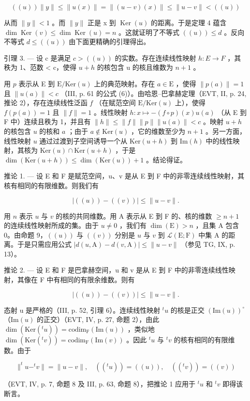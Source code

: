 \[
((u)) \| y \| \leqslant \| u (x) \| = \| (u - v) (x) \| \leqslant \| u - v \| <   ((u))
\]

从而 \(\|y\| < 1\) 。而 \(\|y\|\) 正是 x 到 \(\operatorname{Ker}(u)\) 的距离。于是定理 4 蕴含 \(\dim \operatorname{Ker}(v) \leqslant \dim \operatorname{Ker}(u) = n\) 。这就证明了不等式 \(((u)) \leqslant d\) 。反向不等式 \(d \leqslant ((u))\) 由下面更精确的引理得出。

引理 3. — 设 c 是满足 \(c > ((u))\) 的实数。存在连续线性映射 \(h: E \to F\) ，其秩为 1、范数 \textless{} c，使得 \(u + h\) 的核包含 u 的核且维数为 \(n + 1\) 。

用 \(p\) 表示从 E 到 \(\mathrm{E} / \mathrm{Ker}(u)\) 上的典范映射。存在 \(a \in \mathrm{E}\) ，使得 \(\| p(a) \| = 1\) 且 \(\| u(a) \| < c\) （III, p. 61 的公式 (6)）。由哈恩–巴拿赫定理（EVT, II, p. 24, 推论 2），存在连续线性泛函 \(f\) （在赋范空间 \(\mathrm{E} / \mathrm{Ker}(u)\) 上），使得 \(f(p(a)) = 1\) 且 \(\| f \| = 1\) 。线性映射 \(h: x \mapsto -(f \circ p)(x)u(a)\) （从 E 到 F 中）连续且秩为 1，并且有 \(\| h \| \leqslant \| f \| \| p \| \| u(a) \| < c\) 。映射 \(u + h\) 的核包含 \(u\) 的核和 \(a\) ；由于 \(a \notin \mathrm{Ker}(u)\) ，它的维数至少为 \(n + 1\) 。另一方面，线性映射 \(u\) 通过过渡到子空间诱导一个从 \(\mathrm{Ker}(u + h)\) 到 \(\mathrm{Im}(h)\) 中的线性映射，其核为 \(\mathrm{Ker}(u) \cap \mathrm{Ker}(u + h)\) ，于是 \(\dim(\mathrm{Ker}(u + h)) \leqslant \dim(\mathrm{Ker}(u)) + 1\) 。结论得证。

推论 1. --- 设 E 和 F 是赋范空间，u、v 是从 E 到 F 中的非零连续线性映射，其核有相同的有限维数。则我们有

\[
\left| \left((u)\right) - ((v)) \right| \leqslant \| u - v \|.
\]

用 \(n\) 表示 \(u\) 与 \(v\) 的核的共同维数。用 A 表示从 E 到 F 的、核的维数 \(\geqslant n + 1\) 的连续线性映射所成的集。由于 \(u \neq 0\) ，我们有 \(\dim(\mathrm{E}) > n\) ，且集 A 包含 0。由命题 9，\(((u))\) 与 \(((v))\) 分别是 \(u\) 与 \(v\) 到 \(\mathcal{L}(\mathrm{E};\mathrm{F})\) 中集 A 的距离。于是只需应用公式 \(|d(u,\mathrm{A}) - d(v,\mathrm{A})| \leqslant \|u - v\|\) （参见 TG, IX, p. 13）。

推论 2. --- 设 E 和 F 是巴拿赫空间，u 和 v 是从 E 到 F 中的非零连续线性映射，其像在 F 中有相同的有限余维数。则有

\[
| ((u)) - ((v)) | \leqslant \| u - v \|.
\]

态射 u 是严格的（III, p. 52, 引理 6）。连续线性映射 \({}^{t}u\) 的核是正交 \((\mathrm{Im}(u))^{\circ}\) （\(\mathrm{Im}(u)\) 的正交）（EVT, IV, p. 27, 命题 2），由此 \(\dim(\mathrm{Ker}({}^{t}u)) = \mathrm{codim}_{\mathrm{F}}(\mathrm{Im}(u))\) ，类似地 \(\dim(\mathrm{Ker}({}^{t}v)) = \mathrm{codim}_{\mathrm{F}}(\mathrm{Im}(v))\) 。因此 \({}^{t}u\) 与 \({}^{t}v\) 的核有相同的有限维数。由于

\[
\| ^ {t} u - ^ {t} v \| = \| u - v \|, \quad ((^ {t} u)) = ((u)), \quad ((^ {t} v)) = ((v))
\]

（EVT, IV, p. 7, 命题 8 及 III, p. 63, 命题 8），把推论 1 应用于 \(^{t}u\) 和 \(^{t}v\) 即得该断言。

